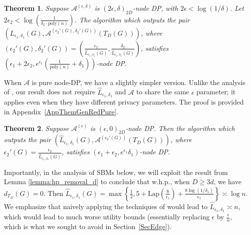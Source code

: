 \documentclass{article}
\newtheorem{theorem}{Theorem}
\begin{document}
\begin{theorem}
\label{theorem:generic_red}
Suppose $\mathcal{A}^{(\epsilon, \delta)}$ is $(2\epsilon, \delta)_{2D}$-node DP, with $2\epsilon < \log(1/\delta)$. Let $2\epsilon_2 < \log\left(\frac{1}{\delta_2\cdot\mathrm{poly}(n)}\right)$. The algorithm which outputs the pair $(\hat{L}_{\epsilon_1, \delta_1}(G), \mathcal{A}^{(\epsilon_2'(G), \delta_2'(G))}(T_D(G)))$, where $(\epsilon_2'(G), \delta_2'(G)) = \left(\frac{\epsilon_2}{\hat{L}_{\epsilon_1, \delta_1}(G)}, \frac{\delta_2}{\hat{L}_{\epsilon_1, \delta_1}(G)}\right)$, satisfies $\left(\epsilon_1 + 2\epsilon_2, e^{\epsilon_1}\left(\frac{1}{\mathrm{poly}(n)} + \delta_1\right)\right)$-node DP.
\end{theorem}

When $\mathcal{A}$ is pure node-DP, we have a slightly simpler version.
Unlike the analysis of \cite{kasiviswanathan2013analyzing}, our result does not require $\hat{L}_{\epsilon_1,\delta_1}$ and $\mathcal{A}$ to share the same $\epsilon$ parameter; it applies even when they have different privacy parameters. The proof is provided in Appendix~\ref{AppThemGenRedPure}.

\begin{theorem}
\label{theorem:generic_red_pure}
Suppose $\mathcal{A}^{(\epsilon)}$ is $(\epsilon, 0)_{2D}$-node DP. Then the algorithm which outputs the pair $(\hat{L}_{\epsilon_1, \delta_1}(G), \mathcal{A}^{(\epsilon_2'(G))}(T_D(G)))$, where
$\epsilon_2'(G) = \frac{\epsilon_2}{\hat{L}_{\epsilon_1, \delta_1}(G)}$, satisfies $(\epsilon_1 + \epsilon_2, e^{\epsilon_1}\delta_1)$-node DP.
\end{theorem}

Importantly, in the analysis of SBMs below, we will exploit the result from Lemma \ref{lemma:hp_removal_d} to conclude that w.h.p., when $D \ge 3d$, we have $d_{T_{D}}(G) = 0$. Then $\hat{L}_{\epsilon_1, \delta_1}(G) = \max\left\{\frac{1}{2}, 5 + \mathrm{Lap}\left(\frac{8}{\epsilon_1}\right) + \frac{8\log(1/\delta_1)}{\epsilon_1}\right\} \asymp \log n$. We emphasize that naively applying the techniques of \cite{kasiviswanathan2013analyzing} would lead to $\hat{L}_{\epsilon_1, \delta_1} \asymp n$, which would lead to much worse utility bounds (essentially replacing $\epsilon$ by $\frac{\epsilon}{n}$, which is what we sought to avoid in Section~\ref{SecEdge}).
\end{document}
